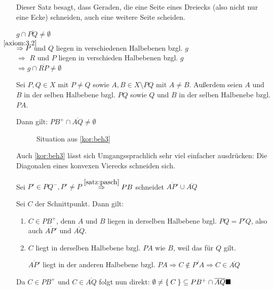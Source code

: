 Dieser Satz besagt, dass Geraden, die eine Seite eines Dreiecks 
(also nicht nur eine Ecke) schneiden, auch eine weitere Seite 
scheiden.

\begin{beweis}
    $g \cap \overline{PQ} \neq \emptyset$\\
    $\overset{\mathclap{\ref{axiom:3.2}}}{\Rightarrow} P$ und $Q$ liegen in verschiedenen Halbebenen bzgl. $g$\\
    $\Rightarrow$ \obda $R$ und $P$ liegen in verschieden
    Halbebenen bzgl. $g$\\
    $\Rightarrow g \cap \overline{RP} \neq \emptyset$
\end{beweis}

\begin{bemerkung}\label{kor:beh3}
    Sei $P, Q \in X$ mit $P \neq Q$ sowie $A, B \in X \setminus PQ$ 
    mit $A \neq B$.
    Außerdem seien $A$ und $B$ in der selben Halbebene bzgl. $PQ$ sowie
    $Q$ und $B$ in der selben Halbenebe bzgl. $PA$.

    Dann gilt: $PB^+ \cap \overline{AQ} \neq \emptyset$
\end{bemerkung}

\begin{figure}[htp]
    \centering
    
    \caption{Situation aus \cref{kor:beh3}}
    \label{fig:geometry-5}
\end{figure}

Auch \cref{kor:beh3} lässt sich Umgangssprachlich sehr viel 
einfacher ausdrücken: Die Diagonalen eines konvexen Vierecks 
schneiden sich.

\begin{beweis}%
    Sei $P' \in PQ^-, P' \neq P$
    $\overset{\cref{satz:pasch}}{\Rightarrow} PB$ schneidet
    $\overline{AP'} \cup \overline{AQ}$

    Sei $C$ der Schnittpunkt. Dann gilt:
    \begin{enumerate}[label=(\roman*)]
        \item $C \in PB^+$, denn $A$ und $B$ liegen in derselben
              Halbebene bzgl. $PQ = P'Q$, also auch
              $\overline{AP'}$ und $\overline{AQ}$.
        \item $C$ liegt in derselben Halbebene bzgl. $PA$ wie
              $B$, weil das für $Q$ gilt.

              $\overline{AP'}$ liegt in der anderen Halbebene
              bzgl. $PA \Rightarrow C \notin \overline{P'A} \Rightarrow C \in \overline{AQ}$
    \end{enumerate}
    Da $C \in PB^+$ und $C \in \overline{AQ}$ folgt nun direkt: 
    $\emptyset \neq \Set{C} \subseteq PB^+ \cap \overline{AQ} \qed$
\end{beweis}

